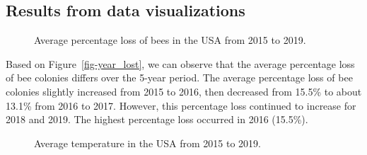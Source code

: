 \documentclass[
  letterpaper,
  DIV=11,
  numbers=noendperiod]{scrartcl}
\begin{document}
\subsection{Results from data
visualizations}\label{results-from-data-visualizations}

\begin{figure}


\caption{\label{fig-year\_lost}Average percentage loss of bees in the
USA from 2015 to 2019.}

\end{figure}%

Based on Figure~\ref{fig-year_lost}, we can observe that the average
percentage loss of bee colonies differs over the 5-year period. The
average percentage loss of bee colonies slightly increased from 2015 to
2016, then decreased from 15.5\% to about 13.1\% from 2016 to 2017.
However, this percentage loss continued to increase for 2018 and 2019.
The highest percentage loss occurred in 2016 (15.5\%).

\begin{figure}


\caption{\label{fig-year\_temp}Average temperature in the USA from 2015
to 2019.}

\end{figure}%
\end{document}
